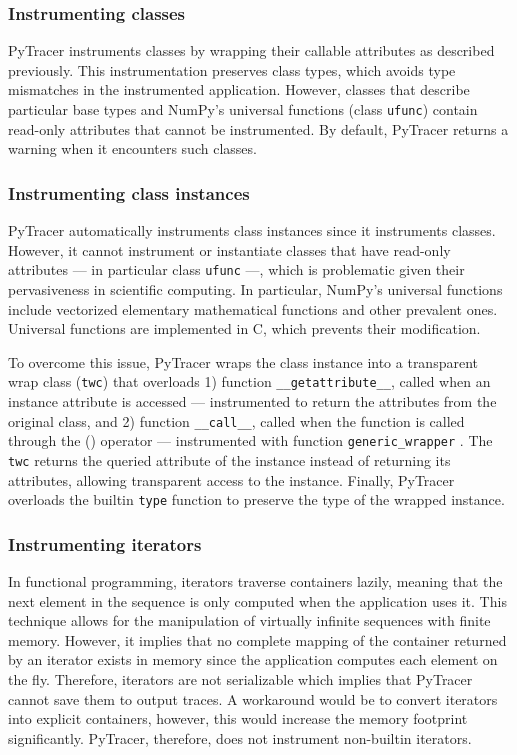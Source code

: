 \documentclass[11pt]{article}
\newcommand{\pytracer}[0]{PyTracer\xspace}
\begin{document}
\subsubsection{Instrumenting classes}

\pytracer instruments classes by wrapping their callable attributes as described previously. 
This instrumentation preserves class types, which avoids type mismatches in the instrumented application.
However, classes that describe particular base types and NumPy's universal functions (class \texttt{ufunc}) contain read-only attributes that cannot be instrumented.
By default, \pytracer returns a warning when it encounters such classes. 

\subsubsection{Instrumenting class instances}

\pytracer automatically instruments class instances since it instruments classes. However, it cannot instrument or instantiate classes that have read-only attributes --- in particular class \texttt{ufunc} ---, which is problematic given their pervasiveness in scientific computing. In particular, NumPy's universal functions include
vectorized elementary mathematical functions and other prevalent ones. Universal functions are implemented in C, which prevents their modification.

To overcome this issue, \pytracer wraps the class instance into a transparent wrap class (\texttt{twc}) that overloads
1) function \texttt{\_\_getattribute\_\_}, called when an instance attribute is accessed --- instrumented to return the attributes from the original class, and 2) function \texttt{\_\_call\_\_}, called when the function is called through the () operator --- instrumented with function \texttt{generic\_wrapper} . The \texttt{twc} returns the queried attribute of the instance instead of returning its attributes, allowing transparent access to the instance.  Finally, \pytracer overloads the builtin \texttt{type} function to preserve the type of the wrapped instance.

\subsubsection{Instrumenting iterators}

In functional programming, iterators traverse containers lazily, meaning that the next element in the sequence is only computed when the application uses it. This technique allows for the manipulation of virtually infinite sequences with finite memory. However, it implies that no complete mapping of the container returned by an iterator exists in memory since the application computes each element on the fly. Therefore, iterators are not serializable which implies that \pytracer cannot save them to output traces. 
A workaround would be to convert iterators into explicit containers, however, this would increase the memory footprint significantly. \pytracer, therefore, does not instrument non-builtin iterators.
\end{document}
